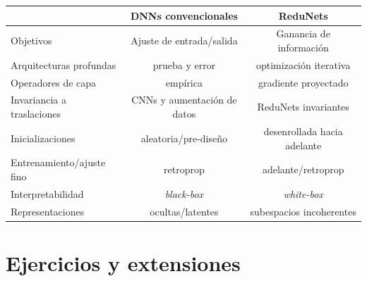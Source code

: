 \documentclass[../../book-main.tex]{subfiles}
\begin{document}
\begin{center}
    \begin{tabular}{| l || c | c |}
        \hline
        & DNNs convencionales & ReduNets\\ [0.5ex]
        \hline \hline
        Objetivos & Ajuste de entrada/salida & Ganancia de información \\ [0.5ex]
        \hline
        Arquitecturas profundas & prueba y error & optimización iterativa \\  [0.5ex]
        \hline
        Operadores de capa & empírica & gradiente proyectado \\  [0.5ex]
        \hline
        Invariancia a traslaciones & CNNs y aumentación de datos & ReduNets invariantes \\  [0.5ex]
        \hline
        Inicializaciones & aleatoria/pre-diseño & desenrollada hacia adelante \\ [0.5ex]
        \hline
        Entrenamiento/ajuste fino & retroprop & adelante/retroprop\\ [0.5ex]
        \hline
        Interpretabilidad & \textit{black-box} & \textit{white-box} \\ [0.5ex]
        \hline
        Representaciones & ocultas/latentes & subespacios incoherentes \\ [0.5ex]
        \hline
    \end{tabular}
\end{center}

\section{Ejercicios y extensiones}
\end{document}
